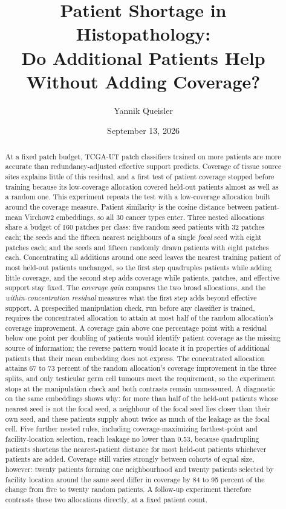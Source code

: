 \documentclass[11pt]{article}
\title{Patient Shortage in Histopathology:\\Do Additional Patients Help\\Without Adding Coverage?}
\author{Yannik Queisler}
\date{September 13, 2026}
\begin{document}
\raggedbottom
{}
\setlength{\emergencystretch}{2em}
\maketitle
\begin{abstract}
\noindent At a fixed patch budget, TCGA-UT patch classifiers trained on more patients are more accurate than redundancy-adjusted effective support predicts. Coverage of tissue source sites explains little of this residual, and a first test of patient coverage stopped before training because its low-coverage allocation covered held-out patients almost as well as a random one. This experiment repeats the test with a low-coverage allocation built around the coverage measure. Patient similarity is the cosine distance between patient-mean Virchow2 embeddings, so all 30 cancer types enter. Three nested allocations share a budget of 160 patches per class: five random seed patients with 32 patches each; the seeds and the fifteen nearest neighbours of a single \emph{focal} seed with eight patches each; and the seeds and fifteen randomly drawn patients with eight patches each. Concentrating all additions around one seed leaves the nearest training patient of most held-out patients unchanged, so the first step quadruples patients while adding little coverage, and the second step adds coverage while patients, patches, and effective support stay fixed. The \emph{coverage gain} compares the two broad allocations, and the \emph{within-concentration residual} measures what the first step adds beyond effective support. A prespecified manipulation check, run before any classifier is trained, requires the concentrated allocation to attain at most half of the random allocation's coverage improvement. A coverage gain above one percentage point with a residual below one point per doubling of patients would identify patient coverage as the missing source of information; the reverse pattern would locate it in properties of additional patients that their mean embedding does not express. The concentrated allocation attains 67 to 73 percent of the random allocation's coverage improvement in the three splits, and only testicular germ cell tumours meet the requirement, so the experiment stops at the manipulation check and both contrasts remain unmeasured. A diagnostic on the same embeddings shows why: for more than half of the held-out patients whose nearest seed is not the focal seed, a neighbour of the focal seed lies closer than their own seed, and these patients supply about twice as much of the leakage as the focal cell. Five further nested rules, including coverage-maximizing farthest-point and facility-location selection, reach leakage no lower than 0.53, because quadrupling patients shortens the nearest-patient distance for most held-out patients whichever patients are added. Coverage still varies strongly between cohorts of equal size, however: twenty patients forming one neighbourhood and twenty patients selected by facility location around the same seed differ in coverage by 84 to 95 percent of the change from five to twenty random patients. A follow-up experiment therefore contrasts these two allocations directly, at a fixed patient count.
\end{abstract}
\end{document}
